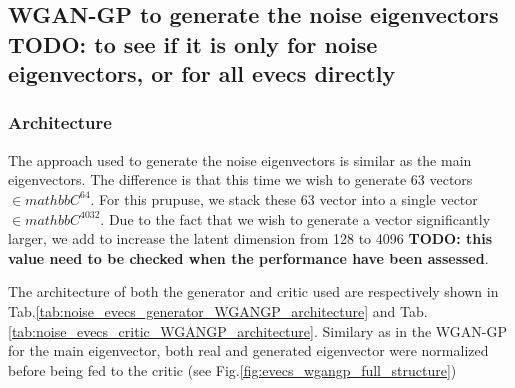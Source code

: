 \documentclass{article}
\begin{document}
\subsection{WGAN-GP to generate the noise eigenvectors \textbf{TODO: to see if it is only for noise eigenvectors, or for all evecs directly}}

\subsubsection{Architecture}

The approach used to generate the noise eigenvectors is similar as the main eigenvectors. The difference is that this time we wish to generate 63 vectors $\in mathbb{C}^64$. For this prupuse, we stack these 63 vector into a single vector $\in mathbb{C}^4032$. Due to the fact that we wish to generate a vector significantly larger, we add to increase the latent dimension from 128 to 4096 \textbf{TODO: this value need to be checked when the performance have been assessed}.

The architecture of both the generator and critic used are respectively shown in Tab.\ref{tab:noise_evecs_generator_WGANGP_architecture} and Tab.\ref{tab:noise_evecs_critic_WGANGP_architecture}. Similary as in the WGAN-GP for the main eigenvector, both real and generated eigenvector were normalized before being fed to the critic (see Fig.\ref{fig:evecs_wgangp_full_structure})
\end{document}
